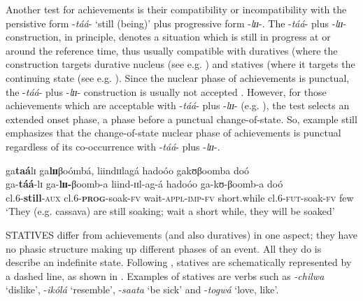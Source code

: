 \documentclass[output=paper]{langscibook}
\begin{document}
Another test for achievements is their compatibility or incompatibility with the persistive form -\textit{táá}- ‘still (being)’ plus progressive form -\textit{lɪɪ}-. The -\textit{táá}- plus -\textit{lɪɪ}- construction, in principle, denotes a situation which is still in progress at or around the reference time, thus usually compatible with duratives (where the construction targets durative nucleus (see e.g. ) and statives (where it targets the continuing state (see e.g. ). Since the nuclear phase of achievements is punctual, the -\textit{táá}- plus -\textit{lɪɪ}- construction is usually not accepted . However, for those achievements which are acceptable with -\textit{táá}- plus -\textit{lɪɪ}- (e.g. ), the test selects an extended onset phase, a phase before a punctual change-of-state. So, example  still emphasizes that the change-of-state nuclear phase of achievements is punctual regardless of its co-occurrence with -\textit{táá}- plus -\textit{lɪɪ}-. 

\label{ex:kanijo:10}
\z

\ea \label{ex:kanijo:11}
\glll ga\textbf{taá}lɪ ga\textbf{l}\textbf{ɪɪ}βoómbá,  liindɪɪlagá hadoóo  gakʊβoomba doó\\
ga-\textbf{táá}-lɪ ga-\textbf{lɪɪ-}βoomb-a liind-ɪɪl-ag-á hadoóo       ga-kʊ-βoomb-a    doó\\ 
cl.6-\textbf{still}-\textsc{aux} cl.6-\textbf{\textsc{prog}}-soak-\textsc{fv} wait-\textsc{appl}-\textsc{imp}-\textsc{fv} short.while cl.6-\textsc{fut}-soak-\textsc{fv} few\\
\glt ‘They (e.g. cassava) are still soaking; wait a short while, they will be soaked’
\z

STATIVES differ from achievements (and also duratives) in one aspect; they have no phasic structure making up different phases of an event. All they do is describe an indefinite state. Following \citet{Kershner2002}, statives are schematically represented by a dashed line, as shown in . Examples of statives are verbs such as \textit{-chilwa} ‘dislike’, -\textit{ikólá} ‘resemble’, -\textit{saata} ‘be sick’ and -\textit{togwá} ‘love, like’. 
\end{document}
